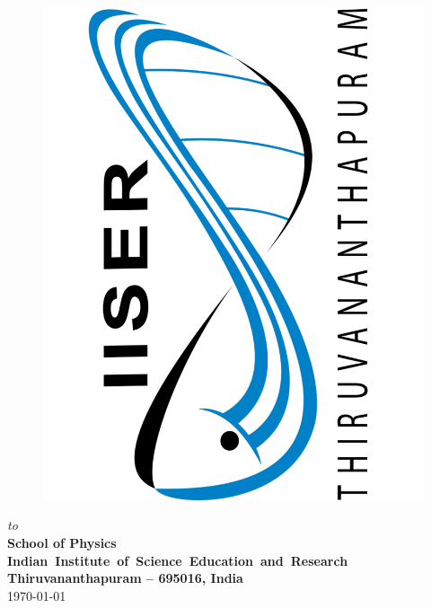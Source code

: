 \documentclass[12pt, a4wide]{report}
\theoremstyle{plain}
\theoremstyle{definition}
\theoremstyle{remark}
\begin{document}
\begin{titlepage}
\begin{center}
\begin{figure}[h]
  \begin{center}
  \includegraphics[scale=0.15, angle=-90]{./images/IISER_Logo.pdf}
  \end{center}
\end{figure}
\vspace*{3.5mm}
{\em to} \\ 
\vspace{2mm}
{\bf\large School of Physics} \\
{\bf\large \mbox{Indian Institute of Science Education and Research}}\\
{\bf\large Thiruvananthapuram -- 695016, India}\\ 
\vspace{2mm}
\today
{}
\end{center}
\end{titlepage}
\clearpage


\end{document}

